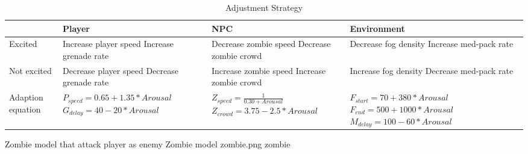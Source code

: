 \begin{table*}[!t]
\caption{Adjustment Strategy}
\label{tbl:adjustment-strategy}
\hfil
\centering
\begin{tabular}{lp{4cm}p{4cm}p{4cm}}
                     & Player                            & NPC                             & Environment \\
\hline
Excited              & Increase player speed \newline Increase grenade rate
                     & Decrease zombie speed \newline Decrease zombie crowd
                     & Decrease fog density \newline Increase med-pack rate  \\
\hline
Not excited          & Decrease player speed \newline Decrease grenade rate
                     & Increase zombie speed \newline Increase zombie crowd
                     & Increase fog density \newline Decrease med-pack rate  \\
\hline
Adaption \newline
equation             & $P_{speed} = 0.65 + 1.35 * Arousal$    \newline $G_{delay} = 40 - 20 * Arousal$
                     & $Z_{speed} = \frac{1}{0.30 + Arousal}$ \newline $Z_{crowd} = 3.75 - 2.5 * Arousal$
                     & $F_{start} = 70 + 380 * Arousal$       \newline $F_{end} = 500 + 1000 * Arousal$ \newline $M_{delay} = 100 - 60 * Arousal$ \\
\end{tabular}
\end{table*}

\largeimg
{Zombie model that attack player as enemy}
{Zombie model}
{zombie.png}
{zombie}



